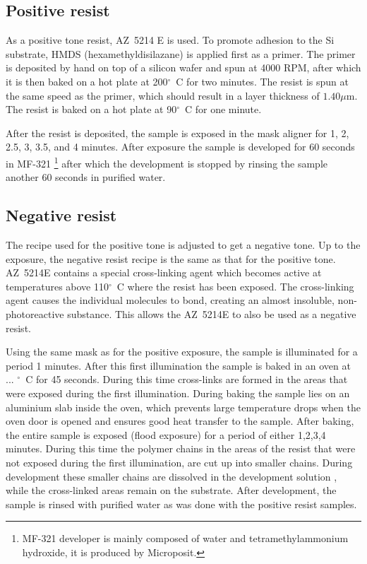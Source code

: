 \subsection*{Positive resist}
As a positive tone resist, AZ~5214 E is used. To promote adhesion to the Si substrate, HMDS (hexamethyldisilazane) is applied first as a primer. The primer is deposited by hand on top of a silicon wafer and spun at 4000 RPM, after which it is then baked on a hot plate at 200$^{\circ}$~C for two minutes. The resist is spun at the same speed as the primer, which should result in a layer thickness of $1.40 \mu$m. The resist is baked on a hot plate at 90$^{\circ}$~C for one minute.

After the resist is deposited, the sample is exposed in the mask aligner for 1, 2, 2.5, 3, 3.5, and 4 minutes. After exposure the sample is developed for 60 seconds in MF-321 \footnote{MF-321 developer is mainly composed of water and tetramethylammonium hydroxide, it is produced by Microposit.} after which the development is stopped by rinsing the sample another 60 seconds in purified water.

\subsection*{Negative resist}
The recipe used for the positive tone is adjusted to get a negative tone. Up to the exposure, the negative resist recipe is the same as that for the positive tone. AZ~5214E contains a special cross-linking agent which becomes active at temperatures above 110$^{\circ}$~C where the resist has been exposed. The cross-linking agent causes the individual molecules to bond, creating an almost insoluble, non-photoreactive substance. This allows the AZ~5214E to also be used as a negative resist.

Using the same mask as for the positive exposure, the sample is illuminated for a period 1  minutes. After this first illumination the sample is baked in an oven at ...  $^\circ$~C for 45 seconds. During this time cross-links are formed in the areas that were exposed during the first illumination. During baking the sample lies on an aluminium slab inside the oven, which prevents large temperature drops when the oven door is opened and ensures good heat transfer to the sample. After baking, the entire sample is exposed (flood exposure) for a period of either 1,2,3,4  minutes. During this time the polymer chains in the areas of the resist that were not exposed during the first illumination, are cut up into smaller chains. During development these smaller chains are dissolved in the development solution , while the cross-linked areas remain on the substrate. After development, the sample is rinsed with purified water as was done with the positive resist samples\cite{productdatasheet}.